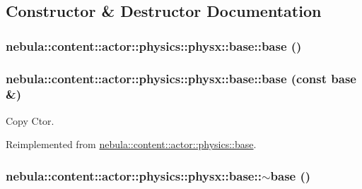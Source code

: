 \subsection{Constructor \& Destructor Documentation}
\hypertarget{classnebula_1_1content_1_1actor_1_1physics_1_1physx_1_1base_aafdc45638786e07d5c5203a1cf164ede}{
\subsubsection[{base}]{\setlength{\rightskip}{0pt plus 5cm}nebula::content::actor::physics::physx::base::base ()}}
\label{classnebula_1_1content_1_1actor_1_1physics_1_1physx_1_1base_aafdc45638786e07d5c5203a1cf164ede}
\hypertarget{classnebula_1_1content_1_1actor_1_1physics_1_1physx_1_1base_af2dec08c2a0fb1a1939ce465f5c96ee5}{
\subsubsection[{base}]{\setlength{\rightskip}{0pt plus 5cm}nebula::content::actor::physics::physx::base::base (const {\bf base} \&)}}
\label{classnebula_1_1content_1_1actor_1_1physics_1_1physx_1_1base_af2dec08c2a0fb1a1939ce465f5c96ee5}


Copy Ctor. 

Reimplemented from \hyperlink{classnebula_1_1content_1_1actor_1_1physics_1_1base_ad2c051b95e85c7112f4b1a927a780248}{nebula::content::actor::physics::base}.\hypertarget{classnebula_1_1content_1_1actor_1_1physics_1_1physx_1_1base_a7753937c9eae2a2fa5a77c349986067c}{
\subsubsection[{$\sim$base}]{\setlength{\rightskip}{0pt plus 5cm}nebula::content::actor::physics::physx::base::$\sim$base ()}}
\label{classnebula_1_1content_1_1actor_1_1physics_1_1physx_1_1base_a7753937c9eae2a2fa5a77c349986067c}


